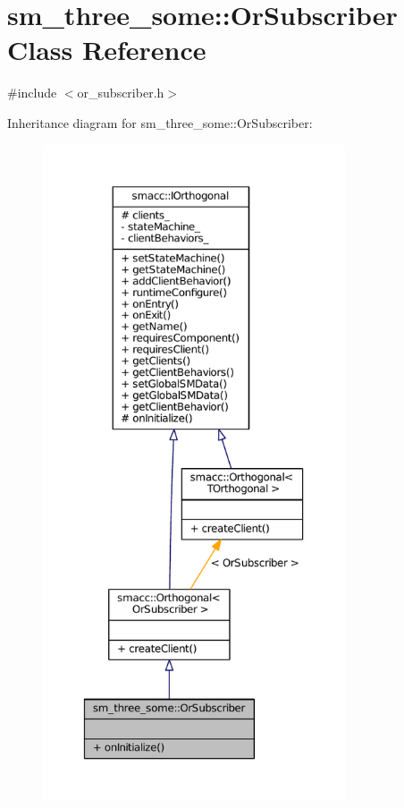\hypertarget{classsm__three__some_1_1OrSubscriber}{}\section{sm\+\_\+three\+\_\+some\+:\+:Or\+Subscriber Class Reference}
\label{classsm__three__some_1_1OrSubscriber}


{\ttfamily \#include $<$or\+\_\+subscriber.\+h$>$}



Inheritance diagram for sm\+\_\+three\+\_\+some\+:\+:Or\+Subscriber\+:
\nopagebreak
\begin{figure}[H]
\begin{center}
\leavevmode
\includegraphics[height=550pt]{classsm__three__some_1_1OrSubscriber__inherit__graph}
\end{center}
\end{figure}


